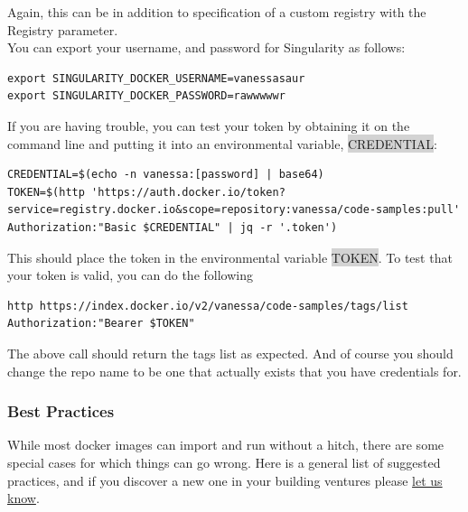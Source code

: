 \documentclass[a4paper]{article}
\newcounter{subsubsubsection}[subsubsection]
\begin{document}
Again, this can be in addition to specification of a custom registry with the Registry parameter.\\[0.1in]
	
	You can export your username, and password for Singularity as follows:
	
\begin{lstlisting}[frame=single]
export SINGULARITY_DOCKER_USERNAME=vanessasaur
export SINGULARITY_DOCKER_PASSWORD=rawwwwwr
\end{lstlisting}

	
	
	If you are having trouble, you can test your token by obtaining it on the command line and putting it into an environmental variable, \colorbox{lightgray}{CREDENTIAL}:
	
\begin{lstlisting}[frame=single]
CREDENTIAL=$(echo -n vanessa:[password] | base64)
TOKEN=$(http 'https://auth.docker.io/token?service=registry.docker.io&scope=repository:vanessa/code-samples:pull' Authorization:"Basic $CREDENTIAL" | jq -r '.token')
\end{lstlisting}
	
	
This should place the token in the environmental variable \colorbox{lightgray}{TOKEN}. To test that your token is valid, you can do the following

\begin{lstlisting}[frame=single]
http https://index.docker.io/v2/vanessa/code-samples/tags/list Authorization:"Bearer $TOKEN"
\end{lstlisting}

	
The above call should return the tags list as expected. And of course you should change the repo name to be one that actually exists that you have credentials for.

\subsubsection{Best Practices}
While most docker images can import and run without a hitch, there are some special cases for which things can go wrong. Here is a general list of suggested practices, and if you discover a new one in your building ventures please \href{https://www.github.com/singularityware/singularityware.github.io/issues}{let us know}.

	
\end{document}
